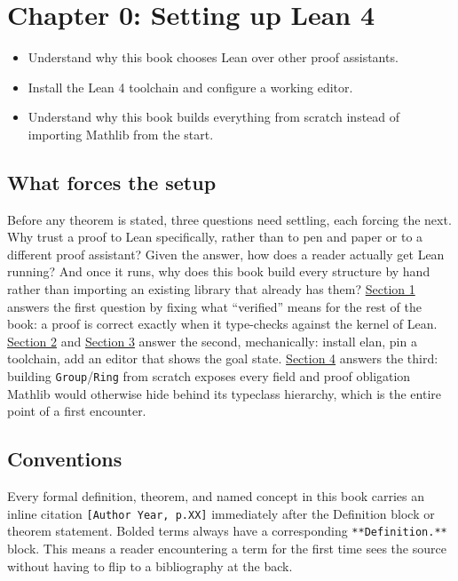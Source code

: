 \chapter{Chapter 0: Setting up Lean 4}\label{sec:00-setup:00-index:1}

\begin{learningobjectives}
\begin{itemize}
\tightlist
\item
  Understand why this book chooses Lean over other proof assistants.
\item
  Install the Lean 4 toolchain and configure a working editor.
\item
  Understand why this book builds everything from scratch instead of importing Mathlib from the start.
\end{itemize}
\end{learningobjectives}


\section*{What forces the setup}\label{sec:00-setup:00-index:2}

Before any theorem is stated, three questions need settling, each forcing the next. Why trust a proof to Lean specifically, rather than to pen and paper or to a different proof assistant? Given the answer, how does a reader actually get Lean running? And once it runs, why does this book build every structure by hand rather than importing an existing library that already has them? \hyperref[sec:00-setup:01-why-lean:1]{Section 1} answers the first question by fixing what ``verified'' means for the rest of the book: a proof is correct exactly when it type-checks against the kernel of Lean. \hyperref[sec:00-setup:02-installing-toolchain:1]{Section 2} and \hyperref[sec:00-setup:03-editor:1]{Section 3} answer the second, mechanically: install elan, pin a toolchain, add an editor that shows the goal state. \hyperref[sec:00-setup:04-mathlib-note:1]{Section 4} answers the third: building \texttt{Group}/\texttt{Ring} from scratch exposes every field and proof obligation Mathlib would otherwise hide behind its typeclass hierarchy, which is the entire point of a first encounter.

\section*{Conventions}\label{sec:00-setup:00-index:3}

Every formal definition, theorem, and named concept in this book carries an inline citation \texttt{[Author Year, p.XX]} immediately after the Definition block or theorem statement. Bolded terms always have a corresponding \texttt{**Definition.**} block. This means a reader encountering a term for the first time sees the source without having to flip to a bibliography at the back.






